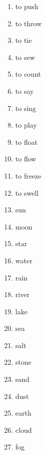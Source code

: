 \begin{multicols}{2}
\begin{enumerate}
\item   to push 

\item   to throw 

\item   to tie 

\item   to sew 

\item   to count 

\item   to say 

\item   to sing 

\item   to play 

\item   to float 

\item   to flow 

\item   to freeze 

\item   to swell 

\item   sun 

\item   moon 

\item   star 

\item   water 

\item   rain 

\item   river 

\item   lake 

\item   sea 

\item   salt 

\item   stone 

\item   sand 

\item   dust 

\item   earth 

\item   cloud 

\item   fog 


\end{enumerate}
\end{multicols}
